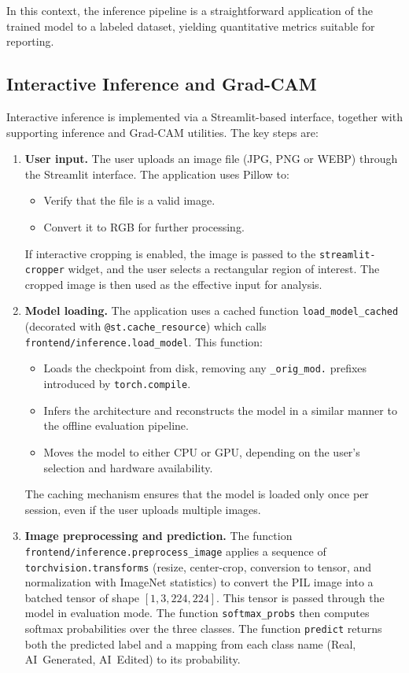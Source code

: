 In this context, the inference pipeline is a straightforward application of the trained model to a labeled dataset, yielding quantitative metrics suitable for reporting.

\subsection{Interactive Inference and Grad-CAM}

Interactive inference is implemented via a Streamlit-based interface, together with supporting inference and Grad-CAM utilities. The key steps are:
\begin{enumerate}
  \item \textbf{User input.} The user uploads an image file (JPG, PNG or WEBP) through the Streamlit interface. The application uses Pillow to:
  \begin{itemize}
    \item Verify that the file is a valid image.
    \item Convert it to RGB for further processing.
  \end{itemize}
  If interactive cropping is enabled, the image is passed to the \texttt{streamlit-cropper} widget, and the user selects a rectangular region of interest. The cropped image is then used as the effective input for analysis.
  \item \textbf{Model loading.} The application uses a cached function \texttt{load\_model\_cached} (decorated with \texttt{@st.cache\_resource}) which calls \texttt{frontend/inference.load\_model}. This function:
  \begin{itemize}
    \item Loads the checkpoint from disk, removing any \texttt{\_orig\_mod.} prefixes introduced by \texttt{torch.compile}.
    \item Infers the architecture and reconstructs the model in a similar manner to the offline evaluation pipeline.
    \item Moves the model to either CPU or GPU, depending on the user's selection and hardware availability.
  \end{itemize}
  The caching mechanism ensures that the model is loaded only once per session, even if the user uploads multiple images.
  \item \textbf{Image preprocessing and prediction.} The function \texttt{frontend/inference.preprocess\_image} applies a sequence of \texttt{torchvision.transforms} (resize, center-crop, conversion to tensor, and normalization with ImageNet statistics) to convert the PIL image into a batched tensor of shape $[1, 3, 224, 224]$. This tensor is passed through the model in evaluation mode. The function \texttt{softmax\_probs} then computes softmax probabilities over the three classes. The function \texttt{predict} returns both the predicted label and a mapping from each class name (Real, AI~Generated, AI~Edited) to its probability.

\end{enumerate}
